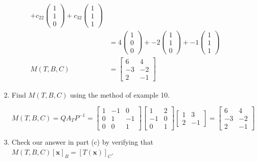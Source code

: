 \documentclass[letterpaper]{article}
\begin{document}
\begin{enumerate}
\begin{enumerate}
\begin{align*}
    +c_{22}\left(\begin{array}{r}1\\1\\0\end{array}\right)
    +c_{32}\left(\begin{array}{r}1\\1\\1\end{array}\right)\\
    &=4\left(\begin{array}{r}1\\0\\0\end{array}\right)
    +-2\left(\begin{array}{r}1\\1\\0\end{array}\right)
    +-1\left(\begin{array}{r}1\\1\\1\end{array}\right)\\
    M(T,B,C)&=\left[\begin{array}{rr}6&4\\-3&-2\\2&-1\end{array}\right]
  \end{align*}
  \item
  Find $M(T,B,C)$ using the method of example 10.

  $M(T,B,C)=QA_TP^{-1}=
  \left[\begin{array}{rrr}1&-1&0\\0&1&-1\\0&0&1\end{array}\right]
  \left[\begin{array}{rr}1&2\\-1&0\\0&1\end{array}\right]
  \left[\begin{array}{rr}1&3\\2&-1\end{array}\right]
  =
  \left[\begin{array}{rr}6&4\\-3&-2\\2&-1\end{array}\right]
  $
  \item
  Check our answer in part (c) by verifying that $M(T,B,C)[\mathbf{x}]_B=[T(\mathbf{x})]_C$.
  

\end{enumerate}
\end{enumerate}
\end{document}
